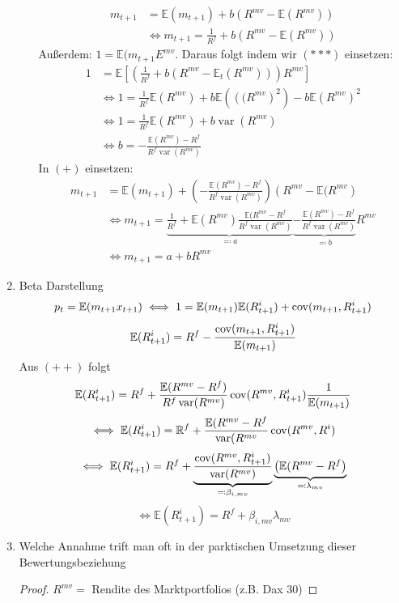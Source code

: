 \documentclass[12pt]{extreport} %
\newcommand{\R}{\mathbb{R}}
\theoremstyle{named}
\theoremstyle{nnamed}
\theoremstyle{itshape}
\theoremstyle{normal}
\begin{document}
\begin{enumerate}
\begin{itemize}
				\begin{align*}
					m_{t+1} & = \mathbb{E}(m_{t+1}) + b \left( R^{mv} - \mathbb{E}(R^{mv}) \right) \tag*{$(+)$} \\
						& \iff m_{t+1} = \frac{1}{R^f} + b \left( R^{mv} - \mathbb{E}(R^{mv}) \right)  \tag*{$(***)$}
				\end{align*}
				Außerdem: $1 = \mathbb{E}(m_{t+1} E^{mv}$. Daraus folgt indem wir $(***)$ einsetzen:
					\begin{align*}
						1 & = \mathbb{E} \left[ \left( \frac{1}{R^f} + b \left( R^{mv} - \mathbb{E}_t \left( R^{mv} \right) \right) \right) R^{mv} \right] \\
						& \iff 1 = \frac{1}{R^f} \mathbb{E}(R^{mv}) + b \mathbb{E}\left( \left((R^{mv} \right)^2 \right) - b \mathbb{E} \left(R^{mv} \right)^2 \\
						& \iff 1 = \frac{1}{R^f} \mathbb{E}(R^{mv}) + b \operatorname{var}(R^{mv}) \\
						& \iff b = - \frac{\mathbb{E}(R^{mv}) - R^f}{R^f \operatorname{var}(R^{mv})}
					\end{align*} 
					In $(+)$ einsetzen:
					\begin{align*}
						m_{t+1} & = \mathbb{E}(m_{t+1}) + \left( - \frac{\mathbb{E}(R^{mv}) - R^f}{R^f \operatorname{var}(R^{mv})} \right) \left( R^{mv} - \mathbb{E}(R^{mv} \right) \\
						& \iff m_{t+1} = \underbrace{\frac{1}{R^f} + \mathbb{E}(R^{mv}) \frac{\mathbb{E}(R^{mv} - R^f}{R^f \operatorname{var}(R^{mv})}}_{\eqqcolon a} \underbrace{- \frac{\mathbb{E}(R^{mv}) - R^f}{R^f \operatorname{var}(R^{mv})}}_{\eqqcolon b} R^{mv} \tag*{$(++)$} \\
						& \iff m_{t+1} = a + b R^{mv}
					\end{align*} 
		\end{itemize}
		\item Beta Darstellung
			$$ p_{t} = \mathbb{E}(m_{t+1} x_{t+1}) \iff 1 = \mathbb{E}(m_{t+1}) \mathbb{E}(R^i_{t+1}) + \operatorname{cov}(m_{t+1}, R^i_{t+1}) $$
			$$ \mathbb{E}(R_{t+1}^i) = R^f - \frac{\operatorname{cov}(m_{t+1}, R_{t+1}^i)}{\mathbb{E}(m_{t+1})} $$
			Aus $(++)$ folgt
			$$ \mathbb{E}(R_{t+1}^i) = R^f + \frac{\mathbb{E}(R^{mv} - R^f)}{R^f \operatorname{var}(R^{mv})} \operatorname{cov}(R^{mv}, R_{t+1}^i) \frac{1}{\mathbb{E}(m_{t+1})} $$
			$$ \iff \mathbb{E}(R_{t+1}^i) = \R^f + \frac{\mathbb{E}(R^{mv} - R^f}{\operatorname{var}(R^{mv}} \cov(R^{mv}, R^i) $$
			$$ \iff \mathbb{E}(R^i_{t+1}) = R^{f} + \underbrace{\frac{\operatorname{cov}(R^{mv}, R^{i}_{t+1})}{\operatorname{var}(R^{mv})}}_{\eqqcolon \beta_{i, mv}} \underbrace{\left( \mathbb{E}(R^{mv} - R^f \right)}_{\eqqcolon \lambda_{mv}} $$
			$$ \iff \mathbb{E}(R^i_{t+1}) = R^f + \beta_{i, mv} \lambda_{mv} $$
		\item Welche Annahme trift man oft in der parktischen Umsetzung dieser Bewertungsbeziehung
			\begin{proof}
				$R^{mv} =$ Rendite des Marktportfolios (z.B. Dax 30)
			\end{proof}
\end{enumerate}
\end{document}
